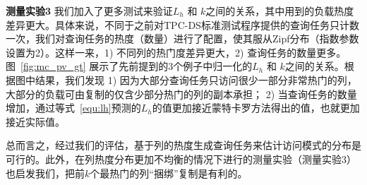 \par \noindent\textbf{测量实验3} 我们加入了更多测试来验证$L_h$ 和 $k$之间的关系，其中用到的负载热度差异更大。具体来说，不同于之前对TPC-DS标准测试程序提供的查询任务只计数一次，我们对查询任务的热度（数量）进行了配置，使其服从Zipf分布（指数参数设置为2）。这样一来，1) 不同列的热门度差异更大，2) 查询任务的数量更多。图~\ref{fig:mc_pv_gt} 展示了先前提到的3个例子中归一化的$L_h$ 和 $k$之间的关系。根据图中结果，我们发现 1) 因为大部分查询任务只访问很少一部分非常热门的列，大部分的负载可由复制的仅含少部分热门的列的副本承担； 2) 当查询任务的数量增加，通过等式~\ref{equ:lh}预测的$L_h$的值更加接近蒙特卡罗方法得出的值，也就更加接近实际值。


\par 总而言之，经过我们的评估，基于列的热度生成查询任务来估计访问模式的分布是可行的。此外，在列热度分布更加不均衡的情况下进行的测量实验（测量实验3）也启发我们，把前$k$个最热门的列“捆绑”复制是有利的。

